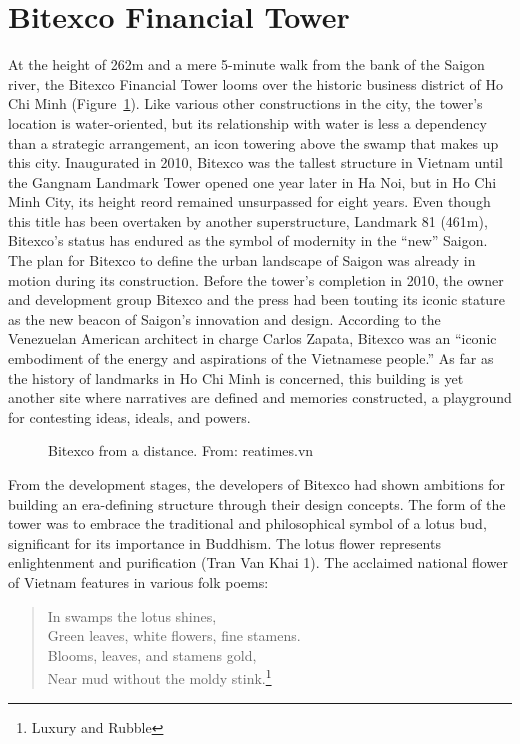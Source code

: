 \section{Bitexco Financial Tower}
At the height of 262m and a mere 5-minute walk from the bank of the Saigon river, the Bitexco Financial Tower looms over the historic business district of Ho Chi Minh (Figure~\ref{bitexco}). Like various other constructions in the city, the tower's location is water-oriented, but its relationship with water is less a dependency than a strategic arrangement, an icon towering above the swamp that makes up this city. Inaugurated in 2010, Bitexco was the tallest structure in Vietnam until the Gangnam Landmark Tower opened one year later in Ha Noi, but in Ho Chi Minh City, its height reord remained unsurpassed for eight years. Even though this title has been overtaken by another superstructure, Landmark 81 (461m), Bitexco’s status has endured as the symbol of modernity in the “new” Saigon. The plan for Bitexco to define the urban landscape of Saigon was already in motion during its construction. Before the tower’s completion in 2010, the owner and development group Bitexco and the press had been touting its iconic stature as the new beacon of Saigon’s innovation and design. According to the Venezuelan American architect in charge Carlos Zapata, Bitexco was an “iconic embodiment of the energy and aspirations of the Vietnamese people.”  As far as the history of landmarks in Ho Chi Minh is concerned, this building is yet another site where narratives are defined and memories constructed, a playground for contesting ideas, ideals, and powers.
\en

\begin{figure}[!ht]
\begin{center}
\vspace{-.2 in}
\caption{\vi Bitexco from a distance. From: reatimes.vn}\label{bitexco}
\end{center}
\vspace{-.2 in}
\end{figure}

\vi From the development stages, the developers of Bitexco had shown ambitions for building an era-defining structure through their design concepts. The form of the tower was to embrace the traditional and philosophical symbol of a lotus bud, significant for its importance in Buddhism. The lotus flower represents enlightenment and purification (Tran Van Khai 1). The acclaimed national flower of Vietnam features in various folk poems:
\begin{verse}
\begin{center}
\hspace{2em} In swamps the lotus shines, \\
Green leaves, white flowers, fine stamens.\\
\hspace{2em} Blooms, leaves, and stamens gold,\\
Near mud without the moldy stink.\footnote{Luxury and Rubble}
\end{center}
\end{verse}

